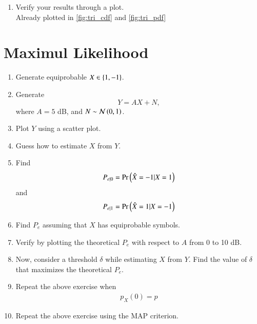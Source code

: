 \documentclass[journal,12pt,twocolumn]{IEEEtran}
\renewcommand\thesection{\arabic{section}}
\begin{document}
\begin{enumerate}[label=\thesection.\arabic*
        ,ref=\thesection.\theenumi]
    \item Verify your results through a plot.\\
          \solution
          Already plotted in \autoref{fig:tri_cdf} and \autoref{fig:tri_pdf}

\end{enumerate}
\section{Maximul Likelihood}
\begin{enumerate}[label=\thesection.\arabic*
        ,ref=\thesection.\theenumi]
    \item Generate equiprobable $X \in \left\{1,-1\right\}$.
    \item Generate
          \begin{equation}
              Y = AX+N,
          \end{equation}
          where $A = 5$ dB,  and $N \sim \mathcal{N}\left(0,1\right)$.
    \item Plot $Y$ using a scatter plot.
    \item Guess how to estimate $X$ from $Y$.
    \item
          \label{ml-ch4_sim}
          Find
          \begin{equation}
              P_{e|0} = \Pr\left(\hat{X} = -1|X=1\right)
          \end{equation}
          and
          \begin{equation}
              P_{e|1} = \Pr\left(\hat{X} = 1|X=-1\right)
          \end{equation}
    \item Find $P_e$ assuming that $X$ has equiprobable symbols.
    \item
          Verify by plotting  the theoretical $P_e$ with respect to $A$ from 0 to 10 dB.
    \item Now, consider a threshold $\delta$  while estimating $X$ from $Y$. Find the value of $\delta$ that maximizes the theoretical $P_e$.
    \item Repeat the above exercise when
          \begin{align}
              p_{X}(0) = p
          \end{align}
    \item Repeat the above exercise using the MAP criterion.
\end{enumerate}
\end{document}
